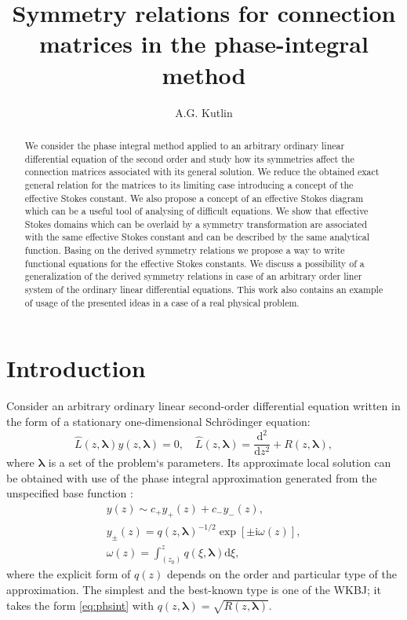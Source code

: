 \documentclass[atmp]{ipart_v1}
\def\LL{\widehat{L}}
\def\rmd{\mathrm{d}}
\def\rmi{\mathrm{i}}
\def\lmbd{\bm{\lambda}}
\def\w{\omega}
\newcommand\eref[1]{\eqref{#1}}
\newcommand\phsintgrnd[1][z]{q(#1,\lmbd)}
\newcommand\predexp[1][z]{q(#1,\lmbd)^{-1/2}}
\newcommand\phsintgrl[3][z]{\int_{#2}^{#3} \phsintgrnd[#1] \rmd #1}
\begin{document}
\title[Symmetry relations for F-matrices]
{Symmetry relations for connection matrices in the phase-integral method}
\author[A.G. Kutlin]{A.G. Kutlin}

\begin{abstract}
We consider the phase integral method applied to
an arbitrary ordinary linear differential equation of the second order and study 
how its symmetries affect the connection matrices associated with its general solution.
We reduce the obtained exact general relation for the matrices to its limiting case introducing
a concept of the effective Stokes constant. We also propose a concept of an effective Stokes 
diagram which can be a useful tool of analysing of difficult equations. We show that effective 
Stokes domains which can be overlaid by a symmetry transformation are associated with the same 
effective Stokes constant and can be described by the same analytical function. Basing on
the derived symmetry relations we propose a way to write functional equations for 
the effective Stokes constants. We discuss a possibility of a generalization of the derived symmetry 
relations in case of an arbitrary order liner system of the ordinary linear differential equations. 
This work also contains an example of usage of the presented ideas in a case of a real physical problem.
\end{abstract}

\maketitle

\section{Introduction \label{sec:intro}}
Consider an arbitrary ordinary linear second-order differential equation 
written in the form of a stationary one-dimensional Schr\"odinger equation:
\begin{equation}
\LL(z,\lmbd)y(z,\lmbd)=0, \quad \LL(z,\lmbd)=\frac{\rmd^2}{\rmd z^2} + R(z,\lmbd),   \label{eq:gen}
\end{equation}
where $\lmbd$ is a set of the problem`s parameters. Its approximate local solution can be
obtained with use of the phase integral approximation generated 
from the unspecified base function \cite{frbook}:
\begin{subequations}
\label{eq:phsint}
\begin{eqnarray}
y(z) \sim c_+y_+(z) + c_-y_-(z), \label{eq:gensol}
\\
y_\pm(z) = \predexp \exp [\pm \rmi \w(z)], \label{eq:phbase}
\\
\w(z)=\phsintgrl[\xi]{(z_0)}{z}, \label{eq:phase}
\end{eqnarray}
\end{subequations}
where the explicit form of $q(z)$ depends on the order and particular type of the approximation.
The simplest and the best-known type is one of the WKBJ\cite{wkb1,wkb2,wkb3,wkbj}; 
it takes the form \eref{eq:phsint} with $\phsintgrnd = \sqrt{R(z,\lmbd)}$. 
\end{document}
